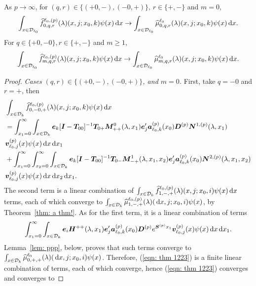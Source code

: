 \begin{thm}\label{thm: a thm2!}
	As \(p\to \infty\), for \((q,r)\in\{(+0,-),(-0,+)\},\, r\in\{+,-\}\) and \(m=0\),  
	\begin{align}\int_{x\in\mathcal{D}_{\ell_0}}\widehat f_{0,q,r}^{\ell_0,(p)}(\lambda)(x,j;x_0,k)\psi(x)\, \mathrm{d} x \to \int_{x\in\mathcal{D}_{\ell_0}}\widehat \mu_{0,q,r}^{\ell_0}(\lambda)(x,j;x_0,k)\psi(x)\, \mathrm{d} x.\end{align}
	For \(q\in\{+0,-0\}, r\in\{+,-\}\) and \(m\geq 1\), 
	\begin{align}\int_{x\in\mathcal{D}_{\ell_0}}\widehat f_{m,q,r}^{\ell_0,(p)}(\lambda)(x,j;x_0,k)\psi(x)\, \mathrm{d} x \to \int_{x\in\mathcal{D}_{\ell_0}}\widehat \mu_{m,q,r}^{\ell_0}(\lambda)(x,j;x_0,k)\psi(x)\, \mathrm{d} x.\label{eqn: thm 22}\end{align}
\end{thm}
\begin{proof}
	\textit{Cases \((q,r) \in \{(+0,-),(-0,+)\}\), and \(m=0\).} First, take \(q=-0\) and \(r=+\), then 
	\begin{align}
		&\int_{x\in\mathcal{D}_k}\widehat{f}_{0,-0,+}^{\ell_0,(p)}(\lambda)(x,j;x_0,k)\psi(x)\, \mathrm{d} x \nonumber 
		\\&=\int_{x_1=0}^\infty \int_{x\in\mathcal{D}_k} \boldsymbol e_k [\boldsymbol I - \boldsymbol T_{00}]^{-1}\boldsymbol T_{0+} \boldsymbol M^0_{++}(\lambda,x_1)\boldsymbol e_j'{} \nonumber
		\boldsymbol a_{\ell_0,k}^{(p)}(x_0) \boldsymbol D^{(p)} \boldsymbol N^{1,(p)}(\lambda,x_1) 
		\\& {\boldsymbol v}_{\ell_0,j}^{(p)}(x)\psi(x)\, \mathrm{d} x\, \mathrm{d} x_{1}  \nonumber
		\\& + \int_{x_1=0}^\infty\int_{x_2=0}^\infty \int_{x\in\mathcal{D}_k}  \boldsymbol e_k [\boldsymbol I - \boldsymbol T_{00}]^{-1}\boldsymbol T_{0-} \boldsymbol M^1_{-+}(\lambda,x_1,x_{2})\boldsymbol e_j'{} \nonumber
		\boldsymbol a_{\ell_0,k}^{(p)}(x_0)\boldsymbol N^{2,(p)}(\lambda,x_1,x_{2}) 
		\\& {\boldsymbol v}_{\ell_0,j}^{(p)}(x)\psi(x)\, \mathrm{d} x\, \mathrm{d} x_{2} \, \mathrm{d} x_1. \label{eqn: thm 1223}
	\end{align}
	The second term is a linear combination of \(\int_{x\in\mathcal{D}_k}\widehat{f}_{1,-,+}^{\ell_0,(p)}(\lambda)(x,j;x_0,i) \psi(x)\, \mathrm{d} x\) terms, each of which converge to \(\int_{x\in\mathcal{D}_k}\widehat{\mu}_{1,-,+}^{\ell_0,(p)}(\lambda)(\, \mathrm{d} x,j;x_0,i) \psi(x)\), by Theorem~\ref{thm: a thm!}. As for the first term, it is a linear combination of terms
	\[\int_{x_1=0}^\infty \int_{x\in\mathcal{D}_k} \boldsymbol e_i \boldsymbol H^{++}(\lambda,x_1)\boldsymbol e_j'{} \nonumber
	\boldsymbol a_{\ell_0,k}^{(p)}(x_0) \boldsymbol D^{(p)} e^{\boldsymbol S^{(p)}x_1} 
	{\boldsymbol v}_{\ell_0,j}^{(p)}(x)\psi(x)\, \mathrm{d} x\, \mathrm{d} x_{1}.\]
	Lemma~\ref{lem: ppp}, below, proves that such terms converge to \(\int_{x\in\mathcal{D}_k}\widehat{\mu}_{0,+,+}^{\ell_0}(\lambda)(\, \mathrm{d} x,j;x_0,i) \psi(x)\). Therefore, (\ref{eqn: thm 1223}) is a finite linear combination of terms, each of which converge, hence (\ref{eqn: thm 1223}) converges and converges to 

\end{proof}
